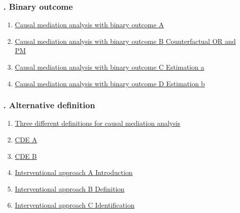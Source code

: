 \documentclass[11pt]{article}
\begin{document}
\vspace{-1cm}

\subsubsection*{. Binary outcome}

\vspace{-0.5cm}

\begin{enumerate}
	\item \href{https://mp.weixin.qq.com/s/Ik32rRrlkNIB-AlhBy6NZQ}{Causal mediation analysis with binary outcome A}	%
	\item \href{https://mp.weixin.qq.com/s/niCB01OT_NscVGvP6I_Fvw}{Causal mediation analysis with binary outcome B Counterfactual OR and PM}	%
	\item \href{https://mp.weixin.qq.com/s/yQg9Vr9YinbQCZW_8fVwxQ}{Causal mediation analysis with binary outcome C Estimation a}	%
	\item \href{https://mp.weixin.qq.com/s/oniTcLXzqKiho7i3uDsv0A}{Causal mediation analysis with binary outcome D Estimation b}	%
\end{enumerate}

\vspace{-1cm}

\subsubsection*{. Alternative definition}

\vspace{-0.5cm}

\begin{enumerate}
	\item \href{https://mp.weixin.qq.com/s/ULs-LgvmoyZg9Q00kLoOcQ}{Three different definitions for causal mediation analysis}	%
	\item \href{https://mp.weixin.qq.com/s/pti3oszhsNJY6r5aZOUYhA}{CDE A}	%
	\item \href{https://mp.weixin.qq.com/s/xLrNXJFeMtjvd3Wnivc06g}{CDE B}	%
	\item \href{https://mp.weixin.qq.com/s/vEsX4FY3R-y-8ulHakQifw}{Interventional approach A Introduction}	%
	\item \href{https://mp.weixin.qq.com/s/qUxU9v45u5qgJ9WWlkY2JA}{Interventional approach B Definition}	%
	\item \href{https://mp.weixin.qq.com/s/nj-NmXpdj8qhT03ect3F2w}{Interventional approach C Identification}	%
\end{enumerate}
\end{document}
